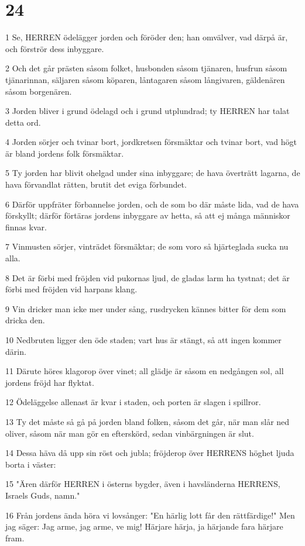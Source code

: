 \chapter{24}

\par 1 Se, HERREN ödelägger jorden och föröder den; han omvälver, vad därpå är, och förströr dess inbyggare.
\par 2 Och det går prästen såsom folket, husbonden såsom tjänaren, husfrun såsom tjänarinnan, säljaren såsom köparen, låntagaren såsom långivaren, gäldenären såsom borgenären.
\par 3 Jorden bliver i grund ödelagd och i grund utplundrad; ty HERREN har talat detta ord.
\par 4 Jorden sörjer och tvinar bort, jordkretsen försmäktar och tvinar bort, vad högt är bland jordens folk försmäktar.
\par 5 Ty jorden har blivit ohelgad under sina inbyggare; de hava överträtt lagarna, de hava förvandlat rätten, brutit det eviga förbundet.
\par 6 Därför uppfräter förbannelse jorden, och de som bo där måste lida, vad de hava förskyllt; därför förtäras jordens inbyggare av hetta, så att ej många människor finnas kvar.
\par 7 Vinmusten sörjer, vinträdet försmäktar; de som voro så hjärteglada sucka nu alla.
\par 8 Det är förbi med fröjden vid pukornas ljud, de gladas larm ha tystnat; det är förbi med fröjden vid harpans klang.
\par 9 Vin dricker man icke mer under sång, rusdrycken kännes bitter för dem som dricka den.
\par 10 Nedbruten ligger den öde staden; vart hus är stängt, så att ingen kommer därin.
\par 11 Därute höres klagorop över vinet; all glädje är såsom en nedgången sol, all jordens fröjd har flyktat.
\par 12 Ödeläggelse allenast är kvar i staden, och porten är slagen i spillror.
\par 13 Ty det måste så gå på jorden bland folken, såsom det går, när man slår ned oliver, såsom när man gör en efterskörd, sedan vinbärgningen är slut.
\par 14 Dessa häva då upp sin röst och jubla; fröjderop över HERRENS höghet ljuda borta i väster:
\par 15 "Ären därför HERREN i österns bygder, även i havsländerna HERRENS, Israels Guds, namn."
\par 16 Från jordens ända höra vi lovsånger: "En härlig lott får den rättfärdige!" Men jag säger: Jag arme, jag arme, ve mig! Härjare härja, ja härjande fara härjare fram.
